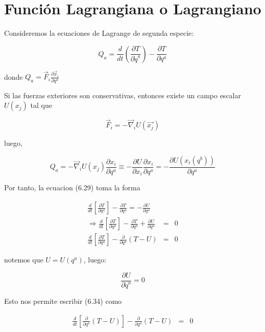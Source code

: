 \documentclass[12pt]{report}
\begin{document}
\section{Función Lagrangiana o Lagrangiano}


Consideremos la ecuaciones de Lagrange de segunda especie:

\begin{equation}
Q_a=\frac{d}{dt} \left( \frac{\partial T}{\partial \dot{q}^a} \right) - \frac{\partial T}{\partial q^a} 
\end{equation}

donde $Q_a= \displaystyle \vec{F}_i \frac{\partial \vec{x}_i}{\partial q^a} $

Si las fuerzas exteriores  son conservativas, entonces existe un campo escalar $U(x_j)$ tal que 

\begin{equation}
\vec{F}_i = - \vec{\nabla}_i U(\vec{x_j})
\end{equation}


luego,


\begin{equation}
Q_a=-\vec{\nabla}_i U(x_j)  \frac{\partial x_i}{\partial q^a} \equiv - \frac{\partial U}{\partial x_i} \frac{\partial x_i}{\partial q^a} = -\frac{\partial U(x_i(q^b))}{\partial q^a}
\end{equation}

Por tanto, la ecuacion (6.29) toma la forma

\begin{eqnarray}
\frac{d}{dt} \left[ \frac{\partial T}{\partial q^a} \right]- \frac{\partial T}{\partial q^a} =  - \frac{\partial U}{\partial q^a} && \\
 \Rightarrow \frac{d}{dt} \left[ \frac{\partial T}{\partial q^a} \right]- \frac{\partial T}{\partial q^a}  + \frac{\partial U}{\partial q^a}&=& 0 \\
\frac{d}{dt} \left[ \frac{\partial T}{\partial q^a} \right]- \frac{\partial}{\partial q^a} \left( T-U \right) &=&  0
\end{eqnarray}

notemos que $U=U(q^a)$, luego:

\begin{equation}
\frac{\partial U}{\partial \dot{q}^a}=0
\end{equation}

Esto nos permite escribir (6.34) como

\begin{eqnarray}
\frac{d}{dt} \left[ \frac{\partial}{\partial q^a} \left( T-U \right) \right]- \frac{\partial}{\partial q^a} \left( T-U \right) &=&  0
\end{eqnarray}
\end{document}

